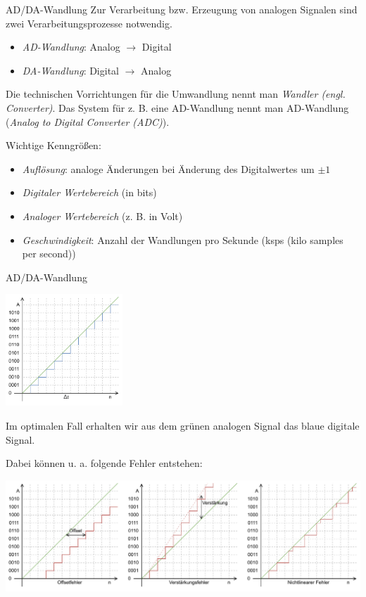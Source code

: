 \begin{defi}{AD/DA-Wandlung}
    Zur Verarbeitung bzw. Erzeugung von analogen Signalen sind zwei Verarbeitungsprozesse notwendig.
    \begin{itemize}
        \item \emph{AD-Wandlung}: Analog $\to$ Digital
        \item \emph{DA-Wandlung}: Digital $\to$ Analog
    \end{itemize}

    Die technischen Vorrichtungen für die Umwandlung nennt man \emph{Wandler (engl. Converter)}.
    Das System für z. B. eine AD-Wandlung nennt man AD-Wandlung (\emph{Analog to Digital Converter (ADC)}).

    Wichtige Kenngrößen:
    \begin{itemize}
        \item \emph{Auflösung}: analoge Änderungen bei Änderung des Digitalwertes um $\pm 1$
        \item \emph{Digitaler Wertebereich} (in bits)
        \item \emph{Analoger Wertebereich} (z. B. in Volt)
        \item \emph{Geschwindigkeit}: Anzahl der Wandlungen pro Sekunde (ksps (kilo samples per second))
    \end{itemize}
\end{defi}

\begin{example}{AD/DA-Wandlung}
    \begin{center}
        \includegraphics[width=0.33\textwidth]{includes/figures/example_ad_da.pdf}
    \end{center}

    Im optimalen Fall erhalten wir aus dem grünen analogen Signal das blaue digitale Signal.

    Dabei können u. a. folgende Fehler entstehen:

    \includegraphics[width=\textwidth]{includes/figures/example_ad_da_error.pdf}
\end{example}

